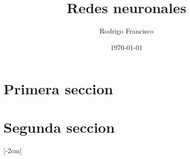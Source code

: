 \documentclass[12pt,a4paper]{article}
\author{Rodrigo Francisco}
\title{Redes neuronales}
\date{\today}
\begin{document}
\layout
\maketitle

\begin{multicols}{2}
  
  \section{Primera seccion}
  \lipsum[1]

  \section{Segunda seccion}
  \lipsum[1-4]
  [-2cm]
\end{multicols}
\end{document}

